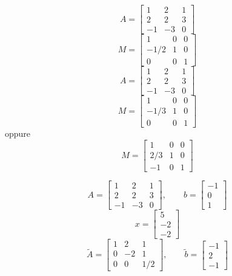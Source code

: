 

\bigskip
$$A=\left[
\begin{array}{ccc}
1 & 2 & 1 \\
2 & 2 & 3\\
-1 & -3 & 0
\end{array}\right]
$$
\bigskip
$$ M=\left[
\begin{array}{ccc}
  1 & 0 & 0 \\
  -1/2 & 1 & 0 \\
  0 & 0 & 1
\end{array}
\right]$$
\bigskip
$$A=\left[
\begin{array}{ccc}
1 & 2 & 1 \\
2 & 2 & 3\\
-1 & -3 & 0
\end{array}\right]
$$
\bigskip
$$ M=\left[
\begin{array}{ccc}
  1 & 0 & 0 \\
  -1/3 & 1 & 0 \\
  0 & 0 & 1
\end{array}
\right]$$ oppure
\bigskip
$$ M=\left[
\begin{array}{ccc}
  1 & 0 & 0 \\
  2/3 & 1 & 0 \\
  -1 & 0 & 1
\end{array}
\right]$$


\bigskip
$$A=\left[
\begin{array}{ccc}
1 & 2 & 1 \\
2 & 2 & 3\\
-1 & -3 & 0
\end{array}\right],\quad \quad
b=\left[
\begin{array}{c}
  -1\\
   0 \\
   1
\end{array}\right]$$
\medskip
$$x=\left[
\begin{array}{c}
  5 \\
  -2 \\
  -2
\end{array}\right]$$
$$\tilde A=\left[
\begin{array}{ccc}
  1 & 2 & 1 \\
  0 & -2 & 1 \\
  0 & 0 & 1/2
\end{array}\right],\quad \quad \tilde b=\left[
\begin{array}{c}
  -1 \\
  2 \\
  -1
\end{array}\right]$$

